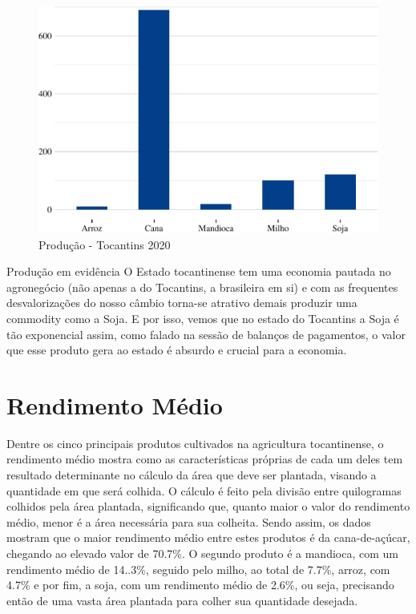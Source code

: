 \begin{figure}[h]
	\caption{Produção - Tocantins 2020}
	\includegraphics{fig/producao-1.pdf}
\end{figure}

\begin{smbox}[label={labelbox},nameref={Agricultura}]{Produção em evidência}
	O Estado tocantinense tem uma economia pautada no agronegócio (não apenas a do Tocantins, a brasileira em si) e com as frequentes desvalorizações do nosso câmbio torna-se atrativo demais produzir uma commodity como a Soja. E por isso, vemos que no estado do Tocantins a Soja é tão exponencial assim, como falado na sessão de balanços de pagamentos, o valor que esse produto gera ao estado é absurdo e crucial para a economia.
\end{smbox}

\section{Rendimento Médio}
\par Dentre os cinco principais produtos cultivados na agricultura tocantinense, o rendimento médio mostra como as características próprias de cada um deles tem resultado determinante no cálculo da área que deve ser plantada, visando a quantidade em que será colhida. O cálculo é feito pela divisão entre quilogramas colhidos pela área plantada, significando que, quanto maior o valor do rendimento médio, menor é a área necessária para sua colheita. Sendo assim, os dados mostram que o maior rendimento médio entre estes produtos é da cana-de-açúcar, chegando ao elevado valor de 70.7\%. O segundo produto é a mandioca, com um rendimento médio de 14..3\%, seguido pelo milho, ao total de 7.7\%, arroz, com 4.7\% e por fim, a soja, com um rendimento médio de 2.6\%, ou seja, precisando então de uma vasta área plantada para colher sua quantidade desejada. 

